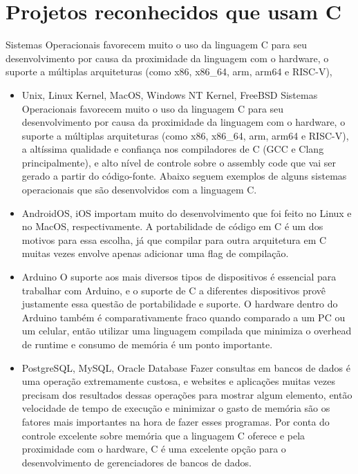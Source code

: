 \chapter{Projetos reconhecidos que usam C}

Sistemas Operacionais favorecem muito o uso da linguagem C para seu desenvolvimento por causa da proximidade da 
linguagem com o hardware, o suporte a múltiplas arquiteturas (como x86, x86\_64, arm, arm64 e RISC-V),

\begin{itemize}
    \item Unix, Linux Kernel, MacOS, Windows NT Kernel, FreeBSD
    Sistemas Operacionais favorecem muito o uso da linguagem C 
    para seu desenvolvimento por causa da proximidade da linguagem com o hardware, 
    o suporte a múltiplas arquiteturas (como x86, x86\_64, arm, arm64 e RISC-V), a altíssima 
    qualidade e confiança nos compiladores de C (GCC e Clang principalmente), e alto nível de 
    controle sobre o assembly code que vai ser gerado a partir do código-fonte. Abaixo seguem 
    exemplos de alguns sistemas operacionais que são desenvolvidos com a linguagem C.
\nocite{Unix}
\nocite{KernelLinux}
\nocite{macOS}

    \item AndroidOS, iOS
    importam muito do desenvolvimento que foi feito no Linux e no MacOS, respectivamente.
    A portabilidade de código em C é um dos motivos para essa escolha, já que compilar para outra arquitetura
    em C muitas vezes envolve apenas adicionar uma flag de compilação.
\nocite{Android}
    \item Arduino
    O suporte aos mais diversos tipos de dispositivos é essencial para trabalhar com Arduino, e o suporte de C a
    diferentes dispositivos provê justamente essa questão de portabilidade e suporte. O hardware dentro do Arduino
    também é comparativamente fraco quando comparado a um PC ou um celular, então utilizar uma linguagem compilada
    que minimiza o overhead de runtime e consumo de memória é um ponto importante.
    \nocite{arduino}

    \item PostgreSQL, MySQL, Oracle Database
    Fazer consultas em bancos de dados é uma operação extremamente custosa, e websites e aplicações muitas vezes precisam
    dos resultados dessas operações para mostrar algum elemento, então velocidade de tempo de execução e minimizar o gasto
    de memória são os fatores mais importantes na hora de fazer esses programas. Por conta do controle excelente sobre memória
    que a linguagem C oferece e pela proximidade com o hardware, C é uma excelente opção para o desenvolvimento de gerenciadores de bancos de dados.
    

\end{itemize}
